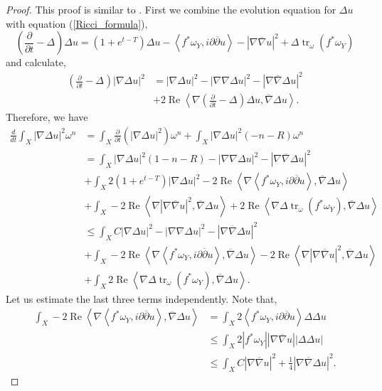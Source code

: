\documentclass[12pt]{article}
\numberwithin{equation}{section}
\renewcommand{\d}{\partial}
\newcommand{\dbar}{\overline{\partial}}
\DeclareMathOperator{\tr}{tr}
\DeclareMathOperator{\Real}{Re}
\newcommand{\oo}[1]{\overline{#1}}
\newcommand{\parabolic}[1]{\left(\frac{\d}{\d t} - \Delta_{#1}\right)}
\newcommand{\ip}[1]{\left\langle#1\right\rangle}
\begin{document}
\begin{proof} This proof is similar to \cite[Thm 4.5]{TZ16}. First we combine the evolution equation for $\Delta u$ with equation (\ref{Ricci_formula}),
\begin{equation*}
    \parabolic{}\Delta u = (1+e^{t-T}) \Delta u - \ip{f^*\omega_Y, i\d\dbar u} - |\nabla \oo{\nabla} u|^2 + \Delta \tr_\omega(f^*\omega_Y)
\end{equation*}
and calculate,
\begin{align*}
    \parabolic{} |\nabla \Delta u|^2 &= |\nabla \Delta u|^2 - |\nabla \nabla \Delta u|^2 - |\nabla \oo{\nabla} \Delta u|^2\\
    &+ 2 \Real \ip{\nabla \parabolic{} \Delta u, \oo{\nabla} \Delta u}.
\end{align*}
Therefore, we have
{\allowdisplaybreaks
\begin{align*}
    \frac{d}{dt} \int_X |\nabla \Delta u|^2 \omega^n &= \int_X \frac{\d}{\d t}\left( |\nabla \Delta u|^2\right) \omega^n + \int_X |\nabla \Delta u|^2 (-n-R) \omega^n\\
    &= \int_X |\nabla \Delta u|^2(1-n-R)  -|\nabla \nabla \Delta u|^2 - |\nabla \oo{\nabla} \Delta u|^2\\
    &+ \int_X 2 (1+e^{t-T})|\nabla \Delta u|^2-2\Real \ip{\nabla \ip{f^*\omega_Y, i\d\dbar u}, \oo{\nabla} \Delta u}\\
    &+ \int_X - 2 \Real \ip{\nabla |\nabla \oo{\nabla} u|^2, \oo{\nabla} \Delta u} + 2\Real \ip{\nabla \Delta \tr_\omega(f^*\omega_Y), \oo{\nabla} \Delta u}\\
    &\leq \int_X C|\nabla \Delta u|^2 - |\nabla \nabla \Delta u|^2 - |\nabla \oo{\nabla} \Delta u|^2\\
    &+\int_X -2\Real \ip{\nabla \ip{f^*\omega_Y, i\d\dbar u}, \oo{\nabla} \Delta u} - 2 \Real \ip{\nabla |\nabla \oo{\nabla} u|^2, \oo{\nabla} \Delta u}\\
    &+\int_X 2\Real \ip{\nabla \Delta \tr_\omega(f^*\omega_Y), \oo{\nabla} \Delta u}.
\end{align*}
}
Let us estimate the last three terms independently. Note that,
\begin{align*}
    \int_X -2 \Real \ip{\nabla \ip{f^*\omega_Y, i\d\dbar u}, \oo{\nabla} \Delta u}
    &= \int_X 2\ip{f^*\omega_Y, i\d\dbar u} \Delta \Delta u\\
    &\leq \int_X 2|f^*\omega_Y| |\nabla \oo{\nabla} u| |\Delta \Delta u|\\
    &\leq \int_X C |\nabla \oo{\nabla} u|^2 + \frac{1}{4} |\nabla \oo{\nabla} \Delta u|^2.

\end{align*}
\end{proof}
\end{document}
